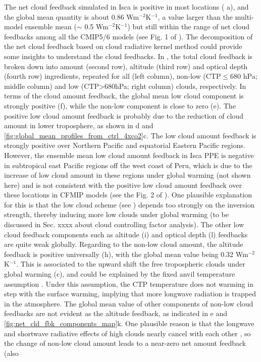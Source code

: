 The net cloud feedback simulated in Isca is positive in most locations ( a), and the global mean quantity is about 0.86 Wm$^{-2}$K$^{-1}$, a value larger than the multi-model ensemble mean ($\sim$ 0.5 Wm$^{-2}$K$^{-1}$) but still within the range of net cloud feedbacks among all the CMIP5/6 models (see Fig. 1 of \citealt{Zelinka2020causes}). The decomposition of the net cloud feedback based on cloud radiative kernel method could provide some insights to understand the cloud feedbacks. In , the total cloud feedback is broken down into amount (second row), altitude (third row) and optical depth (fourth row) ingredients, repeated for all (left column), non-low (CTP$\le$680 hPa; middle column) and low (CTP>680hPa; right column) clouds, respectively. In terms of the cloud amount feedback, the global mean low cloud component is strongly positive (f), while the non-low component is close to zero (e). The positive low cloud amount feedback is probably due to the reduction of cloud amount in lower troposphere, as shown in d and  \ref{fig:global_mean_profiles_from_ctrl_4xco2}c. The low cloud amount feedback is strongly positive over Northern Pacific and equatorial Eastern Pacific regions. However, the ensemble mean low cloud amount feedback in Isca PPE is negative in subtropical east Pacific regions off the west coast of Peru, which is due to the increase of low cloud amount in these regions under global warming (not shown here) and is not consistent with the positive low cloud amount feedback over these locations in CFMIP models (see the Fig. 2 of \citealt{Zelinka2016insights}). One plausible explanation for this is that the low cloud scheme (see ) depends too strongly on the inversion strength, thereby inducing more low clouds under global warming (to be discussed in Sec. xxxx about cloud controlling factor analysis). The other  low cloud feedback components such as altitude (i) and optical depth (l) feedbacks are quite weak globally. Regarding to the non-low cloud amount, the altitude feedback is positive universally (h), with the global mean value being 0.32 Wm$^{-2}$K$^{-1}$. This is associated to the upward shift the free tropospheric clouds under global warming (c), and could be explained by the fixed anvil temperature assumption \citep[e.g.,][]{Hartmann2002FAT, Ceppi2017}. Under this assumption, the CTP temperature does not warming in step with the surface warming, implying that more longwave radiation is trapped in the atmosphere. The global mean value of other components of non-low cloud feedbacks are not evident as the altitude feedback, as indicated in e and \ref{fig:net_cld_fbk_components_map}k. One plausible reason is that the longwave and shortwave radiative effects of high clouds nearly cancel with each other \citep{Kiehl1994observed}, so the change of non-low cloud amount leads to a near-zero net amount feedback (also 